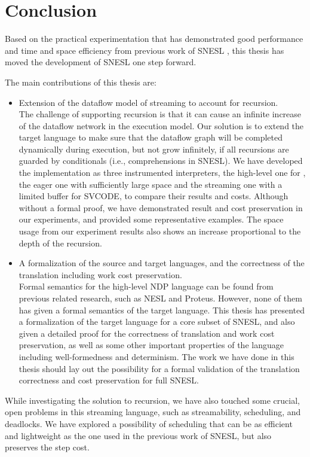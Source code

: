 \chapter{Conclusion}
Based on the practical experimentation that has demonstrated good performance and time and space efficiency from previous work of SNESL \cite{Fphd}, this thesis has moved  the development of SNESL one step forward. 

The main contributions of this thesis are:
\begin{itemize}
	\item Extension of the dataflow model of streaming to account for recursion. \\
	The challenge of supporting recursion is that it can cause an infinite increase of the dataflow network in the execution model.
	Our solution is to extend the target language to make sure that the dataflow graph will be completed dynamically during execution, but not grow infinitely, if all recursions are guarded by conditionals (i.e., comprehensions in SNESL). 
	We have developed the implementation as three instrumented interpreters, the high-level one for \mysnesl, the eager one with sufficiently large space  and the streaming one with a limited buffer for SVCODE, to compare their results and costs. 
	Although without a formal proof, we have demonstrated result and cost preservation in our experiments, and provided some representative examples.
	The space usage from our experiment results also shows an increase proportional to the depth of the recursion. 
	
\item A formalization of the source and target languages, and the correctness of the translation including work cost preservation.  \\
Formal semantics for the high-level NDP language can be found from previous related research, such as NESL and Proteus. However, none of them has given a formal semantics of the target language. 
This thesis has presented a formalization of the target language for a core subset of SNESL, and also given a detailed proof for the correctness of translation and work cost preservation, as well as some other important properties of the language including well-formedness and determinism.
The work we have done in this thesis should lay out the possibility for a formal validation of the translation correctness and cost preservation for full SNESL.
\end{itemize}

While investigating the solution to recursion, we have also touched some crucial, open problems in this streaming language,  such as streamability, scheduling, and deadlocks. 
We have explored a possibility of scheduling that can be as efficient and lightweight as the one used in the previous work of SNESL, but also preserves the step cost.

